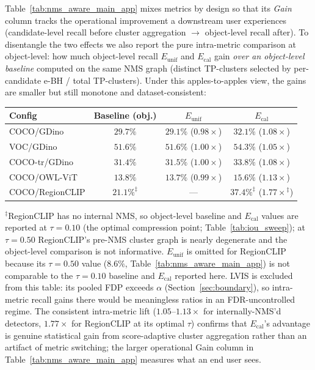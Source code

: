 \documentclass{article}
\theoremstyle{remark}
\newcommand{\1}{\mathbf{1}}
\begin{document}
Table~\ref{tab:nms_aware_main_app} mixes metrics by design so that its
\emph{Gain} column tracks the operational improvement a downstream user
experiences (candidate-level recall before cluster aggregation
$\to$ object-level recall after). To disentangle the two effects we also
report the pure intra-metric comparison at object-level: how much
object-level recall $E_{\mathrm{unif}}$ and $E_{\mathrm{cal}}$ gain
\emph{over an object-level baseline} computed on the same NMS graph
(distinct TP-clusters selected by per-candidate e-BH / total TP-clusters).
Under this apples-to-apples view, the gains are smaller but still
monotone and dataset-consistent:
\begin{center}\small
\begin{tabular*}{0.95\linewidth}{@{\extracolsep{\fill}}lccc@{}}
\toprule
Config & Baseline (obj.) & $E_{\mathrm{unif}}$ & $E_{\mathrm{cal}}$ \\
\midrule
COCO/GDino      & $29.7\%$ & $29.1\%$ ($0.98\times$) & $32.1\%$ ($\mathbf{1.08\times}$) \\
VOC/GDino       & $51.6\%$ & $51.6\%$ ($1.00\times$) & $54.3\%$ ($\mathbf{1.05\times}$) \\
COCO-tr/GDino   & $31.4\%$ & $31.5\%$ ($1.00\times$) & $33.8\%$ ($\mathbf{1.08\times}$) \\
COCO/OWL-ViT    & $13.8\%$ & $13.7\%$ ($0.99\times$) & $15.6\%$ ($\mathbf{1.13\times}$) \\
COCO/RegionCLIP & $21.1\%^{\ddagger}$ & ---  & $\mathbf{37.4\%}^{\ddagger}$ ($\mathbf{1.77\times}^{\ddagger}$) \\
\bottomrule
\end{tabular*}
\end{center}
\noindent
$^{\ddagger}$RegionCLIP has no internal NMS, so object-level baseline
and $E_{\mathrm{cal}}$ values are reported at $\tau\!=\!0.10$ (the
optimal compression point; Table~\ref{tab:iou_sweep}); at $\tau\!=\!0.50$
RegionCLIP's pre-NMS cluster graph is nearly degenerate and the
object-level comparison is not informative.
$E_{\mathrm{unif}}$ is omitted for RegionCLIP because its $\tau\!=\!0.50$
value ($8.6\%$, Table~\ref{tab:nms_aware_main_app}) is not comparable to
the $\tau\!=\!0.10$ baseline and $E_{\mathrm{cal}}$ reported here.
LVIS is excluded from this table: its pooled FDP exceeds $\alpha$
(Section~\ref{sec:boundary}), so intra-metric recall gains there would
be meaningless ratios in an FDR-uncontrolled regime.
The consistent intra-metric lift ($1.05\text{--}1.13\times$ for
internally-NMS'd detectors, $1.77\times$ for RegionCLIP at its optimal
$\tau$) confirms that $E_{\mathrm{cal}}$'s advantage is genuine
statistical gain from score-adaptive cluster aggregation rather than an
artifact of metric switching; the larger operational Gain column in
Table~\ref{tab:nms_aware_main_app} measures what an end user sees.
\end{document}
